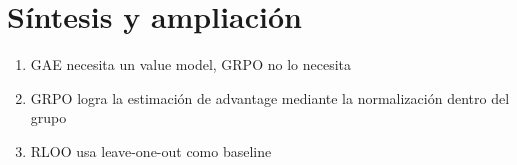 \section{Síntesis y ampliación}
\begin{enumerate}
  \item GAE necesita un value model, GRPO no lo necesita
  \item GRPO logra la estimación de advantage mediante la normalización dentro del grupo
  \item RLOO usa leave-one-out como baseline
\end{enumerate}


